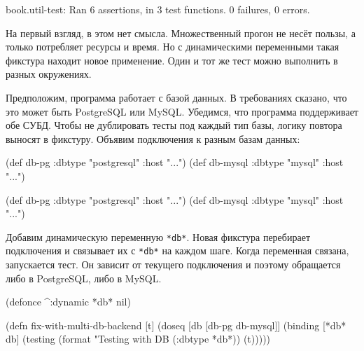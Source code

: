\else

\begin{english}
  \begin{text}
book.util-test: Ran 6 assertions, in 3 test functions.
0 failures, 0 errors.
  \end{text}
\end{english}

\fi

На первый взгляд, в этом нет смысла. Множественный прогон не несёт пользы, а
только потребляет ресурсы и время. Но с динамическими переменными такая фикстура
находит новое применение. Один и тот же тест можно выполнить в разных
окружениях.

Предположим, программа работает с базой данных. В требованиях сказано, что это
может быть PostgreSQL или MySQL. Убедимся, что программа поддерживает обе
СУБД. Чтобы не дублировать тесты под каждый тип базы, логику повтора выносят в
фикстуру. Объявим подключения к разным базам данных:

\ifx\DEVICETYPE\MOBILE

\begin{english}
  \begin{clojure}
(def db-pg
  {:dbtype "postgresql" :host "..."})
(def db-mysql
  {:dbtype "mysql"      :host "..."})
  \end{clojure}
\end{english}

\else

\begin{english}
  \begin{clojure}
(def db-pg    {:dbtype "postgresql" :host "..."})
(def db-mysql {:dbtype "mysql"      :host "..."})
  \end{clojure}
\end{english}

\fi

Добавим динамическую переменную \verb|*db*|. Новая фикстура перебирает
подключения и связывает их с \verb|*db*| на каждом шаге. Когда переменная
связана, запускается тест. Он зависит от текущего подключения и поэтому
обращается либо в PostgreSQL, либо в MySQL.

\ifx\DEVICETYPE\MOBILE

\begin{english}
  \begin{clojure}
(defonce ^:dynamic *db* nil)

(defn fix-with-multi-db-backend [t]
  (doseq [db [db-pg db-mysql]]
    (binding [*db* db]
      (testing
        (format "Testing with DB %
          (:dbtype *db*))
        (t)))))
  \end{clojure}
\end{english}

